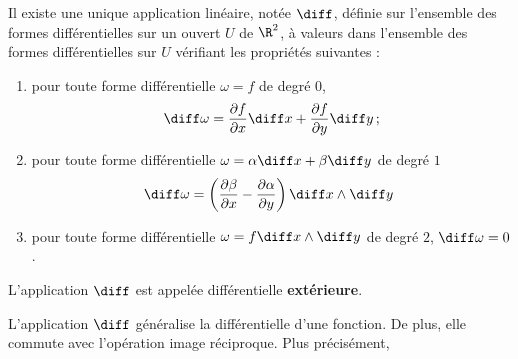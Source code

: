\begin{fprop}
Il existe une unique application linéaire, notée $\diff$, définie sur l'ensemble des formes différentielles sur un ouvert $U$ de $\R^2$, à valeurs dans l'ensemble des formes différentielles sur $U$ vérifiant les propriétés suivantes :
\begin{enumerate}
\item pour toute forme différentielle $\omega=f$ de degré $0$, 
 \[\diff \omega = \frac{\partial f}{\partial x} \diff x  + \frac{\partial f}{\partial y} \diff y \, ; \]

\item pour toute forme différentielle $\omega=\alpha \diff x + \beta \diff y$ de degré $1$ 
\[\diff \omega = \left(\frac{\partial \beta}{\partial x} - \frac{\partial \alpha}{\partial y}\right) \diff x \wedge \diff y \, \;
\] 
\item pour toute forme différentielle $\omega= f \diff x \wedge \diff y$ de degré $2$, $\diff \omega=0$. 
\end{enumerate}
L'application $\diff$ est appelée différentielle \textbf{extérieure}.
\end{fprop}
L'application $\diff$ généralise la différentielle d'une fonction.  De plus, elle commute avec l'opération image réciproque. Plus précisément,

